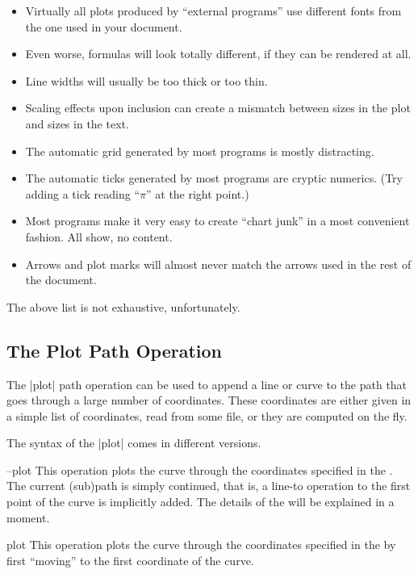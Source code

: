 \begin{itemize}
\item
  Virtually all plots produced by ``external programs'' use different
  fonts from the one used in your document.
\item
  Even worse, formulas will look totally different, if they can be
  rendered at all.
\item
  Line widths will usually be too thick or too thin.
\item
  Scaling effects upon inclusion can create a mismatch between sizes
  in the plot and sizes in the text.
\item
  The automatic grid generated by most programs is mostly
  distracting.
\item
  The automatic ticks generated by most programs are cryptic
  numerics. (Try adding a tick reading ``$\pi$'' at the right point.)
\item
  Most programs make it very easy to create ``chart junk'' in a most
  convenient fashion.  All show, no content.
\item
  Arrows and plot marks will almost never match the arrows used in the
  rest of the document.
\end{itemize}

The above list is not exhaustive, unfortunately.


\subsection{The Plot Path Operation}

The |plot| path operation can be used to append a line or curve to the path
that goes through a large number of coordinates. These coordinates are
either given in a simple list of coordinates, read from some file, or
they are computed on the fly.

The syntax of the |plot| comes in different versions.

\begin{pathoperation}{--plot}{}
  This operation plots the curve through the coordinates specified in
  the . The current (sub)path is simply
  continued, that is, a line-to operation to the first point of the
  curve is implicitly added. The details of the   will be explained in a moment.
\end{pathoperation}

\begin{pathoperation}{plot}{}
  This operation plots the curve through the coordinates specified in
  the  by first ``moving'' to the first
  coordinate of the curve.
\end{pathoperation}

